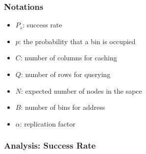 \documentclass[red]{beamer}
\begin{document}

\begin{frame}
\frametitle{Notations}
\begin{itemize}
\item $P_s$: success rate
\item $p$: the probability that a bin is occupied
\item $C$: number of columns for caching
\item $Q$: number of rows for querying
\item $N$: expected number of nodes in the sapce
\item $B$: number of bins for address
\item $\alpha$: replication factor
\end{itemize}
\end{frame}
\begin{frame}
\frametitle{Analysis: Success Rate}
\small{
}
\end{frame}
\end{document}
